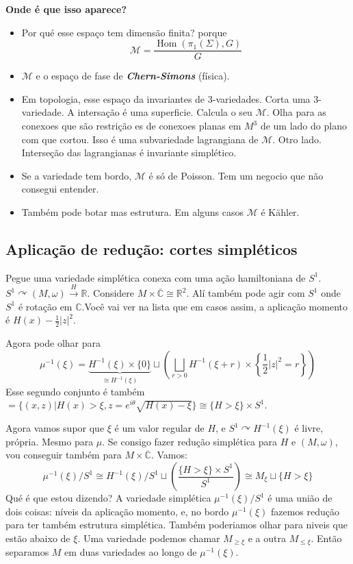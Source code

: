 {\color{8}\bfseries Onde é que isso aparece?}\hspace{.5em}

\begin{itemize}
\item Por qué esse espaço tem dimensão finita? porque
	\[\mathcal{M}=\dfrac{\operatorname{Hom}(\pi_{1}(\Sigma),G)}{G}\]

\item $\mathcal{M}$ e o espaço de fase de \textit{\textbf{Chern-Simons}} (física).

\item Em topologia, esse espaço da invariantes de 3-variedades. Corta uma 3-variedade. A intersação é uma superficie. Calcula o seu $\mathcal{M}$. Olha para as conexoes que são restrição es de conexoes planas em $M^3$ de um lado do plano com que cortou. Isso é uma subvariedade lagrangiana de $\mathcal{M}$. Otro lado. Interseção das lagrangianas é invariante simplético.

\item Se a variedade tem bordo, $\mathcal{M}$ é só de Poisson. Tem um negocio que não consegui entender.

\item Também pode botar mas estrutura. Em alguns casos $\mathcal{M}$ é Kähler.
\end{itemize}

\subsection{Aplicação de redução: cortes simpléticos}

Pegue uma variedade simplética conexa com uma ação hamiltoniana de $S^1$. $S^1\curvearrowright(M,\omega)\overset{H}{\longrightarrow}\mathbb{R}$. Considere $M\times \overline{\mathbb{C}}\cong \mathbb{R}^{2}$. Alí também pode agir com $S^1$ onde $S^1$ é rotação em $\mathbb{C}$.Você vai ver na lista que em casos assim, a aplicação momento é $H(x)-\frac{1}{2}|z|^2$.

Agora pode olhar para
\[\mu^{-1}(\xi)= \underbrace{H^{-1}(\xi)\times \{0\}}_{\cong H^{-1}(\xi)}\sqcup \left( \bigsqcup_{r>0}H^{-1}(\xi+r)\times  \left\{ \frac{1}{2}|z|^2=r \right\}  \right) \]
Esse segundo conjunto é também $=\{(x,z)|H(x)>\xi,z=e^{i\theta}\sqrt{H(x)-\xi} \} \cong \{H>\xi\} \times S^1$.

Agora vamos supor que $\xi$ é um valor regular de $H$, e $S^1\curvearrowright H^{-1}(\xi)$ é livre, própria. Mesmo para $\mu$. Se consigo fazer redução simplética para $H$ e $(M,\omega)$, vou conseguir também para $M\times \overline{\mathbb{C}}$. Vamos:
\[\mu^{-1}(\xi)/S^1\cong H^{-1}(\xi)/S^1\sqcup\left( \dfrac{\{H>\xi\} \times S^1}{S^1} \right) \cong M_\xi\sqcup \{H>\xi\}\]
Qué é que estou dizendo? A variedade simplética $\mu^{-1}(\xi)/S^1$ é uma união de dois coisas: níveis da aplicação momento, e, no bordo $\mu^{-1}(\xi)$ fazemos redução para ter também estrutura simplética. Também poderiamos olhar para niveis que estão abaixo de $\xi$. Uma variedade podemos chamar $M_{\geq \xi}$ e a outra $M_{\leq \xi}$. Então separamos $M$ em duas variedades ao longo de $\mu^{-1}(\xi)$.

